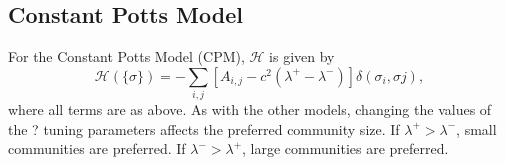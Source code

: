 \documentclass[11pt]{article}
\begin{document}
\subsection{Constant Potts Model}\label{appendix:CPModel}

For the Constant Potts Model (CPM), $\mathcal{H}$ is given by
\begin{equation}\label{eq:CNModel2}
\mathcal{H}(\{\sigma\}) = - \displaystyle\sum_{i,j} \left[A_{i,j} -  c^{2}\left(\lambda^{+} - \lambda^{-}\right)\right]\delta(\sigma_{i}, \sigma{j}),
\end{equation}
where all terms are as above. As with the other models, changing the values of the ? tuning
parameters affects the preferred community size. If $\lambda^{+} > \lambda^{-}$, small communities are preferred. If $\lambda^{-} > \lambda^{+}$, large communities are preferred. \\


\newpage
\end{document}
